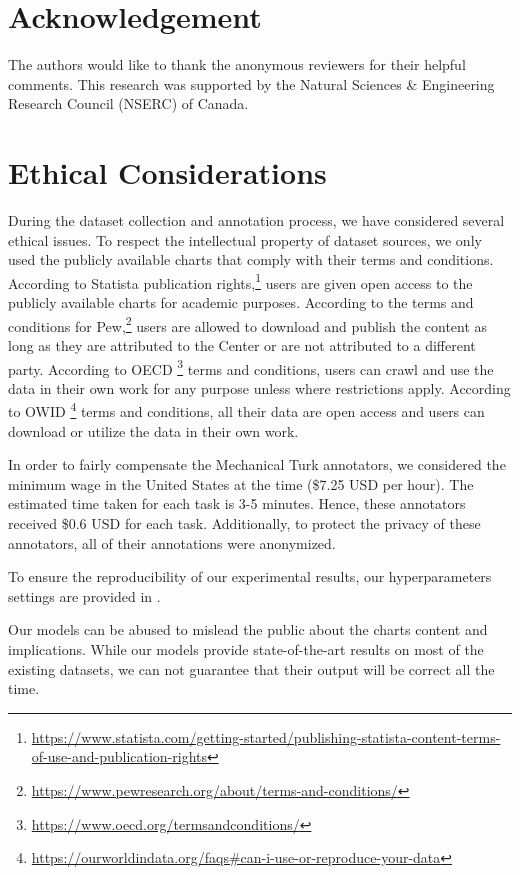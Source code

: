 \documentclass[11pt]{article}
\begin{document}
\section*{Acknowledgement}
The authors would like to thank the anonymous reviewers for their helpful comments. This research was supported by the Natural Sciences \& Engineering Research Council (NSERC) of Canada.

\section*{Ethical Considerations}

During the dataset collection and annotation process, we have considered several ethical issues. To respect the intellectual property of dataset sources, we only used  the publicly available charts that comply with their terms and conditions. According to Statista publication rights,\footnote{\href{https://www.statista.com/getting-started/publishing-statista-content-terms-of-use-and-publication-rights}{https://www.statista.com/getting-started/publishing-statista-content-terms-of-use-and-publication-rights}} users are given open access to the publicly available charts for academic purposes. According to the terms and conditions for Pew,\footnote{\href{https://www.pewresearch.org/about/terms-and-conditions/}{https://www.pewresearch.org/about/terms-and-conditions/}} users are allowed to download and publish the content as long as they are attributed to the Center or are not attributed to a different party. 
According to OECD \footnote{\href{https://www.oecd.org/termsandconditions/}{https://www.oecd.org/termsandconditions/}} terms and conditions, users can crawl and use the data in their own work for any purpose unless where restrictions apply. According to OWID \footnote{\href{https://ourworldindata.org/faqs\#can-i-use-or-reproduce-your-data}{https://ourworldindata.org/faqs\#can-i-use-or-reproduce-your-data}} terms and conditions, all their data are open access and users can download or utilize the data in their own work.


In order to fairly compensate the Mechanical Turk annotators, we considered the minimum wage in the United States at the time (\$7.25 USD per hour). The estimated time taken for each task is 3-5 minutes. Hence, these annotators received \$0.6 USD for each task. Additionally, to protect the privacy of these annotators, all of their annotations were anonymized.

To ensure the reproducibility of our experimental results, our hyperparameters settings are provided in .

Our models can be abused to mislead the public about the charts content and implications. While our models provide state-of-the-art results on most of the existing datasets, we can not guarantee that their output will be correct all the time.



\newpage

\end{document}
